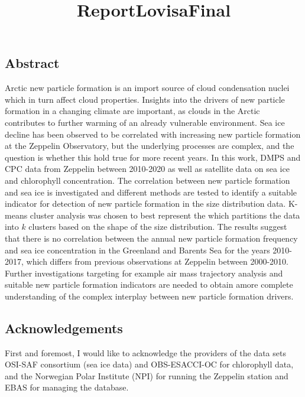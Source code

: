\documentclass[11pt]{article}
\title{ReportLovisaFinal}
\begin{document}
    
    \maketitle
    
    

    
    \hypertarget{abstract}{%
\subsection{Abstract}\label{abstract}}

Arctic new particle formation is an import source of cloud condensation
nuclei which in turn affect cloud properties. Insights into the drivers
of new particle formation in a changing climate are important, as clouds
in the Arctic contributes to further warming of an already vulnerable
environment. Sea ice decline has been observed to be correlated with
increasing new particle formation at the Zeppelin Observatory, but the
underlying processes are complex, and the question is whether this hold
true for more recent years. In this work, DMPS and CPC data from
Zeppelin between 2010-2020 as well as satellite data on sea ice and
chlorophyll concentration. The correlation between new particle
formation and sea ice is investigated and different methods are tested
to identify a suitable indicator for detection of new particle formation
in the size distribution data. K-means cluster analysis was chosen to
best represent the which partitions the data into \(k\) clusters based
on the shape of the size distribution. The results suggest that there is
no correlation between the annual new particle formation frequency and
sea ice concentration in the Greenland and Barents Sea for the years
2010-2017, which differs from previous observations at Zeppelin between
2000-2010. Further investigations targeting for example air mass
trajectory analysis and suitable new particle formation indicators are
needed to obtain amore complete understanding of the complex interplay
between new particle formation drivers.

    \hypertarget{acknowledgements}{%
\subsection{Acknowledgements}\label{acknowledgements}}

First and foremost, I would like to acknowledge the providers of the
data sets OSI-SAF consortium (sea ice data) and OBS-ESACCI-OC for
chlorophyll data, and the Norwegian Polar Institute (NPI) for running
the Zeppelin station and EBAS for managing the database.
\end{document}
